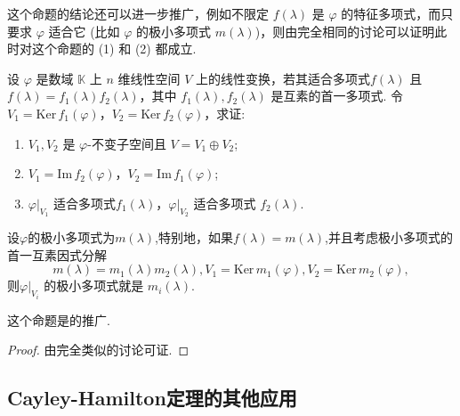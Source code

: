 \documentclass[../../main.tex]{subfiles}
\begin{document}
这个命题的结论还可以进一步推广，例如不限定 $f(\lambda)$ 是 $\varphi$ 的特征多项式，而只要求 $\varphi$ 适合它 (比如 $\varphi$ 的极小多项式 $m(\lambda)$)，则由完全相同的讨论可以证明此时对这个命题的 (1) 和 (2) 都成立. 
\begin{proposition}\label{proposition:矩阵适合多项式诱导的结论}
设 $\varphi$ 是数域 $\mathbb{K}$ 上 $n$ 维线性空间 $V$ 上的线性变换，若其适合多项式$f(\lambda)$ 且 $f(\lambda)=f_1(\lambda)f_2(\lambda)$，其中 $f_1(\lambda),f_2(\lambda)$ 是互素的首一多项式. 令 $V_1 = \mathrm{Ker}\,f_1(\varphi)$，$V_2 = \mathrm{Ker}\,f_2(\varphi)$，求证:
\begin{enumerate}[(1)]
\item  $V_1,V_2$ 是 $\varphi$-不变子空间且 $V = V_1\oplus V_2$;

\item $V_1 = \mathrm{Im}\,f_2(\varphi)$，$V_2 = \mathrm{Im}\,f_1(\varphi)$;

\item $\varphi|_{V_1}$ 适合多项式$f_1(\lambda)$，$\varphi|_{V_2}$ 适合多项式 $f_2(\lambda)$.
\end{enumerate}
设$\varphi$的极小多项式为$m(\lambda)$,特别地，如果$f(\lambda)=m(\lambda)$,并且考虑极小多项式的首一互素因式分解
\[m(\lambda)=m_1(\lambda)m_2(\lambda), V_1 = \mathrm{Ker}\,m_1(\varphi), V_2 = \mathrm{Ker}\,m_2(\varphi),\]
则$\varphi|_{V_i}$ 的极小多项式就是 $m_i(\lambda)$.
\end{proposition}
\begin{remark}
这个命题是的推广.
\end{remark}
\begin{proof}
由完全类似的讨论可证.
\end{proof}



\subsection{Cayley-Hamilton定理的其他应用}
\end{document}
